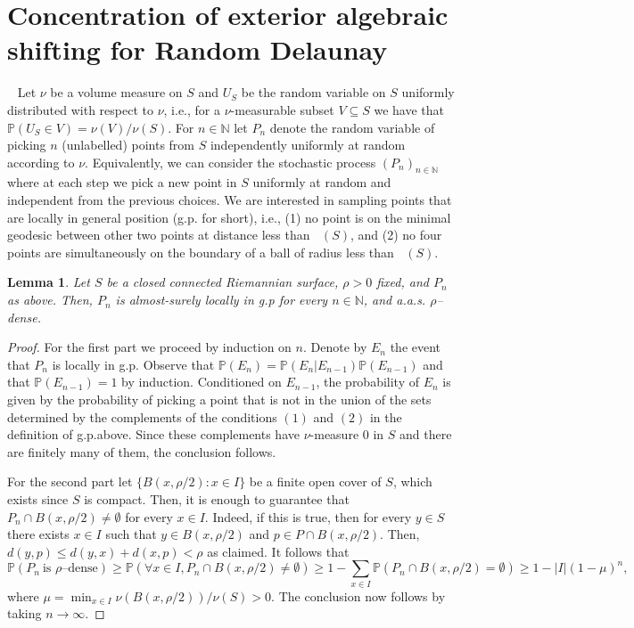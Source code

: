 \documentclass[reqno,english]{amsart}
\newtheorem{lemma}[theorem]{Lemma}
\numberwithin{claimcounter}{theorem}
\theoremstyle{remark}
\theoremstyle{definition}
\numberwithin{theorem}{section}
\newcommand{\N}{\mathbb{N}}
\renewcommand{\P}{\mathbb{P}}
\DeclareMathOperator{\rdel}{r_{Del}}
\begin{document}
\section{Concentration of exterior algebraic shifting for Random Delaunay}~\label{sec:assDelaunay}
Let $\nu$ be a volume measure on $S$ and $U_S$ be the random variable on $S$ uniformly distributed with respect to $\nu$, i.e., for a $\nu$-measurable subset $V\subseteq S$ we have that $\P(U_S\in V)=\nu(V)/\nu(S)$. For $n\in \N$ let $P_n$ denote the random variable of picking $n$ (unlabelled) points from $S$ independently uniformly at random according to $\nu$. Equivalently, we can consider the stochastic process $(P_n)_{n\in \N}$ where at each step we pick a new point in $S$ uniformly at random and independent from the previous choices. We are interested in sampling points that are locally in general position (g.p. for short), i.e., (1) no point is on the minimal geodesic between other two points at distance less
than $\rdel(S)$, and (2) no four points are simultaneously on the boundary of a ball of radius less than $\rdel(S)$.
\begin{lemma}
  \label{l:genericdense}
  Let $S$ be a closed connected Riemannian surface, $\rho>0$ fixed, and $P_n$ as above. Then,  
   $P_n$ is almost-surely locally in g.p for every $n\in \mathbb N$, and a.a.s. $\rho$--dense.
\end{lemma}
\begin{proof}
  For the first part we proceed by induction on $n$. Denote by $E_n$ the event that $P_n$ is locally in g.p. Observe that $\P(E_n)=\P(E_n|E_{n-1})\P(E_{n-1})$ and that $\P(E_{n-1})=1$ by induction. Conditioned on $E_{n-1}$, the probability of $E_n$ is given by the probability of picking a point that is not in the union of the sets determined by the complements of the conditions $(1)$ and $(2)$ in the definition of g.p.above. Since these complements have $\nu$-measure $0$ in $S$ and there are finitely many of them, the conclusion follows.
  
  For the second part let $\{B(x,\rho/2)\colon x\in I\}$ be a finite open cover of $S$, which exists since $S$ is compact. Then, it is enough to guarantee that $P_n\cap B(x,\rho/2)\neq \emptyset$ for every $x\in I$. Indeed, if this is true, then for every $y\in S$ there exists $x\in I$ such that $y\in B(x,\rho/2)$ and $p\in P\cap B(x,\rho/2)$. Then, $d(y,p)\leq d(y,x)+d(x,p)<\rho$ as claimed. It follows that
  $$\P(P_n~\text{is $\rho$--dense}) \geq \P(\forall x\in I, P_n\cap B(x,\rho/2)\neq \emptyset) \geq 1 - \sum_{x\in I}\P(P_n\cap B(x,\rho/2)=\emptyset) 
                         \geq 1-|I|(1-\mu)^n,
  $$
  where 
  $ \mu = \min_{x\in I} \nu(B(x,\rho/2))/\nu(S)>0$. 
  The conclusion now follows by taking $n\to \infty$.
\end{proof}
\end{document}

